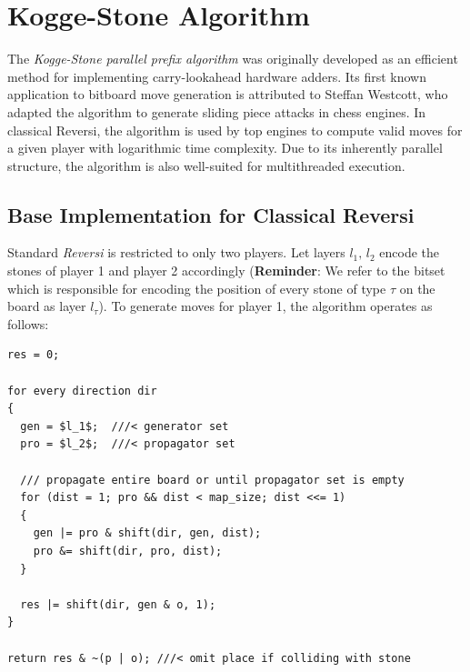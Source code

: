 \section{Kogge-Stone Algorithm}
The \textit{Kogge-Stone parallel prefix algorithm} was originally developed as an efficient method for implementing carry-lookahead hardware adders. Its first known application to bitboard move generation is attributed to Steffan Westcott, who adapted the algorithm to generate sliding piece attacks in chess engines. In classical Reversi, the algorithm is used by top engines to compute valid moves for a given player with logarithmic time complexity. Due to its inherently parallel structure, the algorithm is also well-suited for multithreaded execution. 

\subsection*{Base Implementation for Classical Reversi}
Standard \textit{Reversi} is restricted to only two players. Let layers \(l_1,\,l_2\) encode the stones of player 1 and player 2 accordingly (\textbf{Reminder}: We refer to the bitset which is responsible for encoding the position of every stone of type \(\tau\) on the board as layer \(l_\tau\)). To generate moves for player 1, the algorithm operates as follows: \\
\begin{lstlisting}[mathescape, caption = Kogge–Stone Base Implementation]
res = 0;

for every direction dir
{
  gen = $l_1$;  ///< generator set
  pro = $l_2$;  ///< propagator set

  /// propagate entire board or until propagator set is empty
  for (dist = 1; pro && dist < map_size; dist <<= 1)
  {
    gen |= pro & shift(dir, gen, dist);
    pro &= shift(dir, pro, dist);
  }
	
  res |= shift(dir, gen & o, 1);
}

return res & ~(p | o); ///< omit place if colliding with stone
\end{lstlisting}
\vspace{10px}
